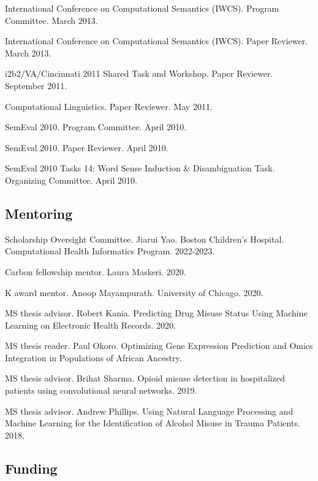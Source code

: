 \documentclass[letterpaper]{article}
\renewenvironment{itemize}{
  \begin{list}{}{
    \setlength{\leftmargin}{1.5em}
  }
}{
  \end{list}
}
\begin{document}
\begin{itemize}
\item International Conference on Computational Semantics (IWCS). Program Committee. March 2013.
\item International Conference on Computational Semantics (IWCS). Paper Reviewer. March 2013.
\item i2b2/VA/Cincinnati 2011 Shared Task and Workshop. Paper Reviewer. September 2011.
\item Computational Linguistics. Paper Reviewer. May 2011.
\item SemEval 2010. Program Committee. April 2010.
\item SemEval 2010. Paper Reviewer. April 2010.
\item SemEval 2010 Tasks 14: Word Sense Induction \& Disambiguation Task. Organizing Committee. April 2010.
\end{itemize}

\subsection*{Mentoring}

\begin{itemize}
\item Scholarship Oversight Committee. Jiarui Yao. Boston Children's Hospital. Computational Health Informatics Program. 2022-2023.
\item Carbon fellowship mentor. Laura Maskeri. 2020.
\item K award mentor. Anoop Mayampurath. University of Chicago. 2020.
\item MS thesis advisor. Robert Kania. Predicting Drug Misuse Status Using Machine Learning on Electronic Health Records. 2020.
\item MS thesis reader. Paul Okoro. Optimizing Gene Expression Prediction and Omics Integration in Populations of African Ancestry.
\item MS thesis advisor. Brihat Sharma. Opioid misuse detection in hospitalized patients using convolutional neural networks. 2019.
\item MS thesis advisor. Andrew Phillips. Using Natural Language Processing and Machine Learning for the Identification of Alcohol Misuse in Trauma Patients. 2018.
\end{itemize}

\subsection*{Funding}
\end{document}
